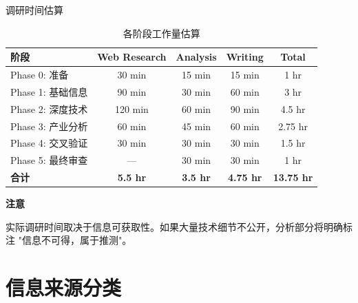 \documentclass[UTF8,11pt,aspectratio=169]{beamer}
\newenvironment{warningblock}{
    \begin{alertblock}{\textbf{\twemoji{warning} 注意}}
}{
    \end{alertblock}
}
\begin{document}
\begin{frame}{调研时间估算}
    \begin{table}
        \centering
        \caption{各阶段工作量估算}
        \begin{tabular}{lcccc}
            \toprule
            \textbf{阶段} & \textbf{Web Research} & \textbf{Analysis} & \textbf{Writing} & \textbf{Total} \\
            \midrule
            Phase 0: 准备 & 30 min & 15 min & 15 min & 1 hr \\
            Phase 1: 基础信息 & 90 min & 30 min & 60 min & 3 hr \\
            Phase 2: 深度技术 & 120 min & 60 min & 90 min & 4.5 hr \\
            Phase 3: 产业分析 & 60 min & 45 min & 60 min & 2.75 hr \\
            Phase 4: 交叉验证 & 30 min & 30 min & 30 min & 1.5 hr \\
            Phase 5: 最终审查 & — & 30 min & 30 min & 1 hr \\
            \midrule
            \textbf{合计} & \textbf{5.5 hr} & \textbf{3.5 hr} & \textbf{4.75 hr} & \textbf{13.75 hr} \\
            \bottomrule
        \end{tabular}
    \end{table}
    \begin{warningblock}
        实际调研时间取决于信息可获取性。如果大量技术细节不公开，分析部分将明确标注
        "信息不可得，属于推测"。
    \end{warningblock}
\end{frame}

\section{信息来源分类}
\end{document}
